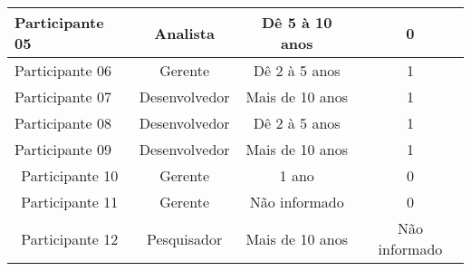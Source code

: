 \begin{table}[htb]
\begin{tabular}{|l|c|c|c|}
Participante 05                                                                       & Analista                                                              & Dê 5 à 10 anos                                                                                    & 0                                                                                 \\ \hline
Participante 06                                                                       & Gerente                                                               & Dê 2 à 5 anos                                                                                     & 1                                                                                 \\ \hline
Participante 07                                                                       & Desenvolvedor                                                         & Mais de 10 anos                                                                                   & 1                                                                                 \\ \hline
Participante 08                                                                       & Desenvolvedor                                                         & Dê 2 à 5 anos                                                                                     & 1                                                                                 \\ \hline
Participante 09                                                                       & Desenvolvedor                                                         & Mais de 10 anos                                                                                   & 1                                                                                 \\ \hline
\multicolumn{1}{|c|}{Participante 10}                                                 & Gerente                                                               & 1 ano                                                                                             & 0                                                                                 \\ \hline
\multicolumn{1}{|c|}{Participante 11}                                                 & Gerente                                                               & Não informado                                                                                     & 0                                                                                 \\ \hline
\multicolumn{1}{|c|}{Participante 12}                                                 & Pesquisador                                                           & Mais de 10 anos                                                                                   & Não informado                                                                     \\ \hline
\end{tabular}
\end{table}
\FloatBarrier
